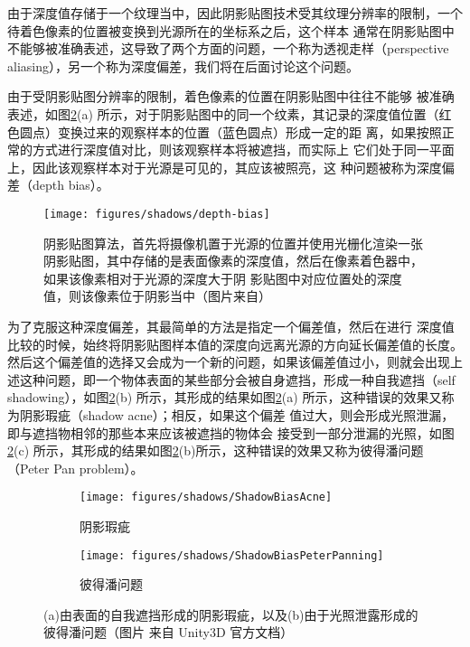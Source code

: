 由于深度值存储于一个纹理当中，因此阴影贴图技术受其纹理分辨率的限制，一个待着色像素的位置被变换到光源所在的坐标系之后，这个样本 通常在阴影贴图中不能够被准确表述，这导致了两个方面的问题，一个称为透视走样（perspective aliasing），另一个称为深度偏差，我们将在后面讨论这个问题。

由于受阴影贴图分辨率的限制，着色像素的位置在阴影贴图中往往不能够 被准确表述，如图\ref{f:df-depth-bias}(a) 所示，对于阴影贴图中的同一个纹素，其记录的深度值位置（红色圆点）变换过来的观察样本的位置（蓝色圆点）形成一定的距 离，如果按照正常的方式进行深度值对比，则该观察样本将被遮挡，而实际上 它们处于同一平面上，因此该观察样本对于光源是可见的，其应该被照亮，这 种问题被称为深度偏差（depth bias）。

\begin{figure}
\begin{fullwidth}
	\texttt{[image: figures/shadows/depth-bias]}
	\caption{阴影贴图算法，首先将摄像机置于光源的位置并使用光栅化渲染一张阴影贴图，其中存储的是表面像素的深度值，然后在像素着色器中，如果该像素相对于光源的深度大于阴 影贴图中对应位置处的深度值，则该像素位于阴影当中（图片来自\cite{b:rts}）}
	\label{f:df-depth-bias} %
\end{fullwidth}
\end{figure}

为了克服这种深度偏差，其最简单的方法是指定一个偏差值，然后在进行 深度值比较的时候，始终将阴影贴图样本值的深度向远离光源的方向延长偏差值的长度。然后这个偏差值的选择又会成为一个新的问题，如果该偏差值过小，则就会出现上述这种问题，即一个物体表面的某些部分会被自身遮挡，形成一种自我遮挡（self shadowing），如图\ref{f:df-depth-bias}(b) 所示，其形成的结果如图\ref{f:df-depth-bias}(a) 所示，这种错误的效果又称为阴影瑕疵（shadow acne）；相反，如果这个偏差 值过大，则会形成光照泄漏，即与遮挡物相邻的那些本来应该被遮挡的物体会 接受到一部分泄漏的光照，如图\ref{f:df-depth-bias}(c) 所示，其形成的结果如图\ref{f:df-depth-bias}(b)所示，这种错误的效果又称为彼得潘问题（Peter Pan problem）。

\begin{figure}
	\begin{subfigure}[b]{0.5\textwidth}
		\texttt{[image: figures/shadows/ShadowBiasAcne]}
		\caption{阴影瑕疵}
	\end{subfigure}
	\begin{subfigure}[b]{0.5\textwidth}
		\texttt{[image: figures/shadows/ShadowBiasPeterPanning]}
		\caption{彼得潘问题}
	\end{subfigure}
	\caption{(a)由表面的自我遮挡形成的阴影瑕疵，以及(b)由于光照泄露形成的彼得潘问题（图片 来自 Unity3D 官方文档）}
	\label{f:df-depth-bias} %
\end{figure}


